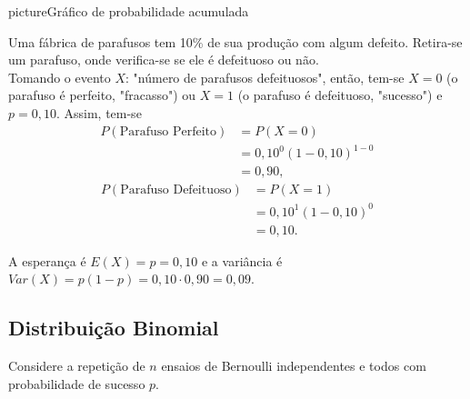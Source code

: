 \begin{sidepicture}{0}{picture}{Gráfico de probabilidade acumulada}
	\label{graph:modelo_bernoulli_acumulada}
	\centering
\end{sidepicture}

\begin{example}
	Uma fábrica de parafusos tem 10\% de sua produção com algum defeito. Retira-se um parafuso, onde verifica-se se ele é defeituoso ou não.\\
	
	Tomando o evento $X$: "número de parafusos defeituosos", então, tem-se $X=0$ (o parafuso é perfeito, "fracasso") ou $X=1$ (o parafuso é defeituoso, "sucesso") e $p=0,10$. Assim, tem-se
	\begin{align*}
		P(\text{Parafuso Perfeito}) &= P(X=0)\\
			&=0,10^{0}(1-0,10)^{1-0}\\
			&=0,90\text{,}
	\end{align*}
	\begin{align*}
		P(\text{Parafuso Defeituoso}) &= P(X=1)\\
			&=0,10^{1}(1-0,10)^{0}\\
			&=0,10\text{.}
	\end{align*}

	A esperança é $E(X)=p=0,10$ e a variância é $Var(X)=p(1-p)=0,10\cdot 0,90=0,09$.
\end{example}

\subsection{Distribuição Binomial}

Considere a repetição de $n$ ensaios de Bernoulli independentes e todos com probabilidade de sucesso $p$.

